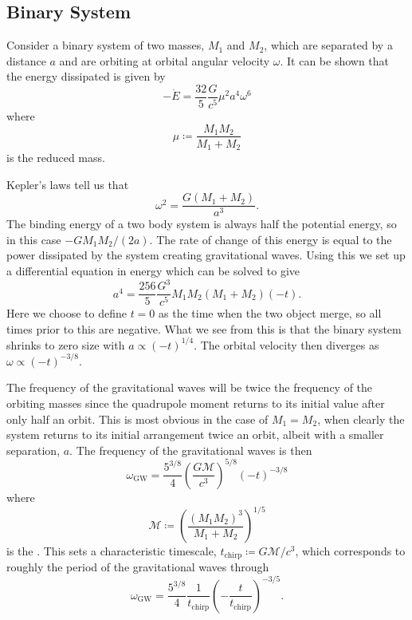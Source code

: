 \documentclass[fleqn]{NotesClass}
\begin{document}
    \subsection{Binary System}
    Consider a binary system of two masses, \(M_1\) and \(M_2\), which are separated by a distance \(a\) and are orbiting at orbital angular velocity \(\omega\).
    It can be shown that the energy dissipated is given by
    \begin{equation}
        -\dot{E} = \frac{32}{5}\frac{G}{c^5} \mu^2 a^4 \omega^6
    \end{equation}
    where
    \begin{equation}
        \mu \coloneqq \frac{M_1M_2}{M_1 + M_2}
    \end{equation}
    is the reduced mass.
    
    Kepler's laws tell us that
    \begin{equation}
        \omega^2 = \frac{G(M_1 + M_2)}{a^3}.
    \end{equation}
    The binding energy of a two body system is always half the potential energy, so in this case \(-GM_1M_2/(2a)\).
    The rate of change of this energy is equal to the power dissipated by the system creating gravitational waves.
    Using this we set up a differential equation in energy which can be solved to give
    \begin{equation}
        a^4 = \frac{256}{5}\frac{G^3}{c^5} M_1M_2(M_1 + M_2)(-t).
    \end{equation}
    Here we choose to define \(t = 0\) as the time when the two object merge, so all times prior to this are negative.
    What we see from this is that the binary system shrinks to zero size with \(a \propto (-t)^{1/4}\).
    The orbital velocity then diverges as \(\omega \propto (-t)^{-3/8}\).
    
    The frequency of the gravitational waves will be twice the frequency of the orbiting masses since the quadrupole moment returns to its initial value after only half an orbit.
    This is most obvious in the case of \(M_1 = M_2\), when clearly the system returns to its initial arrangement twice an orbit, albeit with a smaller separation, \(a\).
    The frequency of the gravitational waves is then
    \begin{equation}
        \omega_{\mathrm{GW}} = \frac{5^{3/8}}{4} \left( \frac{G\mathcal{M}}{c^3} \right)^{5/8}(-t)^{-3/8}
    \end{equation}
    where
    \begin{equation}
        \mathcal{M} \coloneqq \left( \frac{(M_1M_2)^3}{M_1 + M_2} \right)^{1/5}
    \end{equation}
    is the .
    This sets a characteristic timescale, \(t_{\mathrm{chirp}} \coloneqq G\mathcal{M}/c^3\), which corresponds to roughly the period of the gravitational waves through
    \begin{equation}
        \omega_{\mathrm{GW}} = \frac{5^{3/8}}{4} \frac{1}{t_{\mathrm{chirp}}} \left( -\frac{t}{t_{\mathrm{chirp}}} \right)^{-3/5}.
    \end{equation}
    
\end{document}
